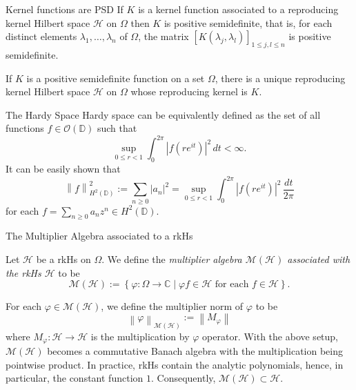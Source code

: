 \documentclass{beamer}
\newcommand{\C}{\mathbb C}
\newcommand{\D}{\mathbb D}
\renewcommand{\le}{\leqslant}
\renewcommand{\ge}{\geqslant}
\newcommand{\calH}{{\mathcal H}}
\newcommand{\calM}{{\mathcal M}}
\newcommand{\calO}{{\mathcal O}}
\newcommand{\norm}[1]{\left\lVert #1 \right\rVert}
\newcommand{\abs}[1]{\left\lvert #1 \right\rvert}
\begin{document}
\begin{frame}{Kernel functions are PSD}
    If $K$ is a kernel function associated to a reproducing kernel Hilbert space $\calH$ on $\Omega$ then $K$ is positive semidefinite, that is, for each distinct elements $\lambda_{1}, \ldots , \lambda_{n}$ of $\Omega$, the matrix $\left[ K\left(\lambda_{j}, \lambda_{l}\right) \right]_{1\le j,l \le n}$ is positive semidefinite.
\pause
\begin{theorem}
	If $K$ is a positive semidefinite function on a set $\Omega$, there is a unique reproducing kernel Hilbert space $\calH$ on $\Omega$ whose reproducing kernel is $K$.
	\label{thm:Moore-Aronszajn}
    \end{theorem}
\end{frame}

\begin{frame}{The Hardy Space}
Hardy space can be equivalently defined as the set of all functions $f \in \calO \left( \D \right)$ such that 
\begin{equation*}
\sup_{0\le r < 1} \int_{0}^{2\pi} \abs{f\left( re^{it} \right)}^{2} \, dt < \infty.
\end{equation*}
\pause
It can be easily shown that
\begin{equation*}
    \norm{f}_{H^{2} \left( \D \right)} ^{2} := \sum_{n\ge 0} \abs{a_{n}}^{2} = \sup_{0\le r < 1} \int_{0}^{2\pi} \abs{f\left( re^{it} \right)}^{2} \, \frac{dt}{2\pi}
\end{equation*}
for each $f= \sum_{n\ge 0} a_{n} z^{n} \in H^{2} \left( \D \right)$.
\end{frame}
\begin{frame}{The Multiplier Algebra associated to a rkHs}
\begin{definition}
Let $\calH$ be a rkHs on $\Omega$. We define the \textit{multiplier algebra $\calM \left( \calH \right)$ associated with the rkHs $\calH$} to be
\begin{equation*}
\calM \left( \calH \right) := \left\{ \varphi :  \Omega \to \C  \mid \varphi f \in \calH \text{ for each } f \in \calH \right\}.
\end{equation*}
\label{def:mult-alg}
\end{definition}
For each $\varphi \in \calM \left( \calH \right)$, we define the multiplier norm of $\varphi$ to be 
\begin{equation*}
\norm{\varphi}_{\calM \left( \calH \right)} := \norm{M_{\varphi}}
\end{equation*}
where $M_{\varphi} : \calH \to \calH$ is the multiplication by $\varphi$ operator.
\pause
With the above setup, $\calM \left( \calH \right)$ becomes a commutative Banach algebra with the multiplication being pointwise product.
\pause
In practice, rkHs contain the analytic polynomials, hence, in particular, the constant function $1$. Consequently, $\calM \left( \calH \right) \subset \calH$.
\end{frame}
\end{document}
